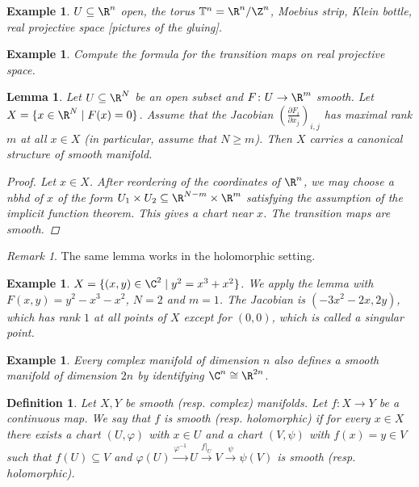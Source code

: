 \documentclass[A4paper, british]{amsart}
\theoremstyle{darkgreentheorem}
\newtheorem{lm}[thm]{Lemma}
\theoremstyle{darkbluedefinition}
\newtheorem{defn}[thm]{Definition}
\theoremstyle{darkredexample}
\newtheorem{exa}[thm]{Example}
\theoremstyle{remark}
\newtheorem{rem}[thm]{Remark}
\newcommand{\1}{\mathbbm{1}}
\newcommand{\tms}{\times}
\newcommand{\sub}{\subseteq}
\begin{document}
\begin{exa}
    $U\sub \R^{n}$ open, the torus $\mathbb{T}^{n}=\R^{n}/\Z^{n}$, Moebius strip, Klein bottle, real projective space [pictures of the gluing].
\end{exa}

\begin{exa}
    Compute the formula for the transition maps on real projective space.
\end{exa}

\begin{lm}
    Let $U\sub \R^{N}$ be an open subset and $F\colon U\to \R^{m}$ smooth.
    Let $X=\{ x\in \R^{N}\mid F(x)=0\}$.
    Assume that the Jacobian $(\frac{\partial F_{i}}{\partial x_{j}})_{i,j}$ has maximal rank $m$ at all $x\in X$ (in particular, assume that $N\geqslant m$).
    Then $X$ carries a canonical structure of smooth manifold.
    \begin{proof}
	Let $x\in X$.
	After reordering of the coordinates of $\R^{n}$, we may choose a nbhd of $x$ of the form $U_{1}\tms U_{2}\sub \R^{N-m}\tms \R^{m}$ satisfying the assumption of the implicit function theorem.
	This gives a chart near $x$.
	The transition maps are smooth.
    \end{proof}
\end{lm}

\begin{rem}
    The same lemma works in the holomorphic setting.
\end{rem}

\begin{exa}
    $X=\{(x,y)\in \C^{2}\mid y^{2}=x^{3}+x^{2} \}$.
    We apply the lemma with $F(x,y)=y^{2}-x^{3}-x^{2}$, $N=2$ and $m=1$.
    The Jacobian is $(-3x^{2}-2x,2y)$, which has rank $1$ at all points of $X$ except for $(0,0)$, which is called a \textit{singular point}.
\end{exa}

\begin{exa}
    Every complex manifold of dimension $n$ also defines a smooth manifold of dimension $2n$ by identifying $\C^{n}\cong \R^{2n}$.
\end{exa}

\begin{defn}
    Let $X,Y$ be smooth (resp. complex) manifolds.
    Let $f\colon X\to Y$ be a continuous map.
    We say that $f$ is \textit{smooth} (resp. \textit{holomorphic}) if for every $x\in X$ there exists a chart $(U,\varphi)$ with $x\in U$ and a chart $(V,\psi)$ with $f(x)=y\in V$ such that $f(U)\sub V$ and $\varphi(U)\xrightarrow{\varphi^{-1}}U\xrightarrow{f|_{U}} V\xrightarrow{\psi} \psi(V)$ is smooth (resp. holomorphic).
\end{defn}
\end{document}
